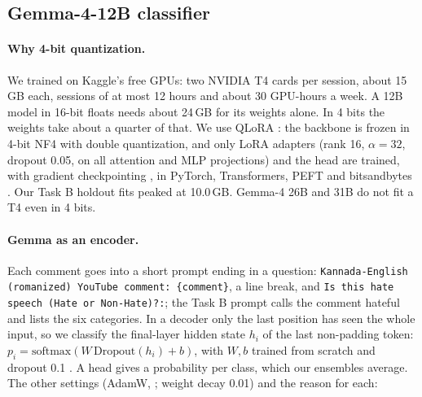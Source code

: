 \documentclass[11pt]{article}
\newcommand{\taskb}{Task B}
\begin{document}
\subsection{Gemma-4-12B classifier}
\paragraph{Why 4-bit quantization.} We trained on Kaggle's free GPUs: two NVIDIA
T4 cards per session, about 15\,GB each, sessions of at most 12 hours and about
30 GPU-hours a week. A 12B model in 16-bit floats needs about 24\,GB for its
weights alone. In 4 bits the weights take about a quarter of that. We use QLoRA
\citep{dettmers-etal-2023-qlora}: the backbone is frozen in 4-bit NF4 with double
quantization, and only LoRA adapters \citep{hu-etal-2022-lora} (rank 16,
$\alpha=32$, dropout 0.05, on all attention and MLP projections) and the head are
trained, with gradient checkpointing \citep{chen-etal-2016-training}, in PyTorch,
Transformers, PEFT and bitsandbytes \citep{paszke-etal-2019-pytorch,
wolf-etal-2020-transformers, mangrulkar-etal-2022-peft, dettmers-etal-2022-llmint8}.
Our \taskb{} holdout fits peaked at 10.0\,GB. Gemma-4 26B and 31B do not
fit a T4 even in 4 bits.

\paragraph{Gemma as an encoder.} Each comment goes into a short prompt ending in a
question: \texttt{Kannada-English (romanized) YouTube comment: \{comment\}}, a line
break, and \texttt{Is this hate speech (Hate or Non-Hate)?:}; the \taskb{} prompt
calls the comment hateful and lists the six categories. In a decoder only the
last position has seen the whole input, so we classify the final-layer hidden
state $h_i$ of the last non-padding token:
$p_i = \mathrm{softmax}(W\,\mathrm{Dropout}(h_i) + b)$, with $W, b$ trained from
scratch and dropout 0.1 \citep{srivastava-etal-2014-dropout}. A head gives a probability per class, which our
ensembles average. The other settings (AdamW, \citealp{loshchilov-hutter-2019-decoupled}; weight
decay 0.01) and the reason for each:
\end{document}
